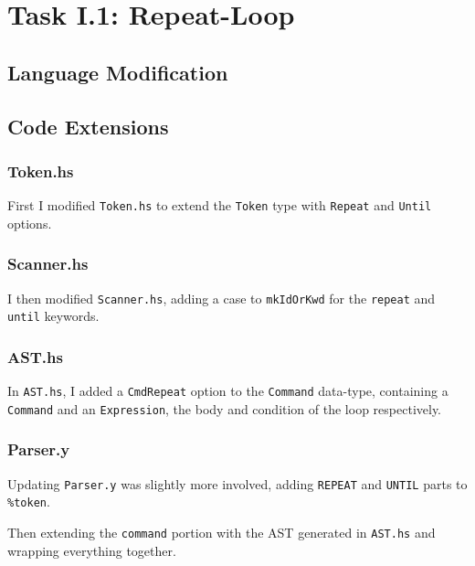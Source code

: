 \documentclass[12pt]{article}
\newcommand{\lstin}[3]{%
  
}
\begin{document}
\maketitle
\tableofcontents
\pagebreak
\section{Task I.1: Repeat-Loop}
\subsection{Language Modification}

\subsection{Code Extensions}
\subsubsection{Token.hs}
First I modified \verb|Token.hs| to extend the \verb|Token| type with \verb|Repeat| and \verb|Until| options.

\lstin{47}{48}{Token.hs}

\subsubsection{Scanner.hs}
I then modified \verb|Scanner.hs|, adding a case to \verb|mkIdOrKwd| for the \verb|repeat| and \verb|until| keywords.

\lstin{153}{154}{Scanner.hs}

\subsubsection{AST.hs}
In \verb|AST.hs|, I added a \verb|CmdRepeat| option to the \verb|Command| data-type, containing a \verb|Command| and an \verb|Expression|, the body and condition of the loop respectively.

\lstin{118}{123}{AST.hs}

\subsubsection{Parser.y}
Updating \verb|Parser.y| was slightly more involved, adding \verb|REPEAT| and \verb|UNTIL| parts to \verb|%token|.

\lstin{72}{73}{Parser.y}

Then extending the \verb|command| portion with the AST generated in \verb|AST.hs| and wrapping everything together.
\end{document}
